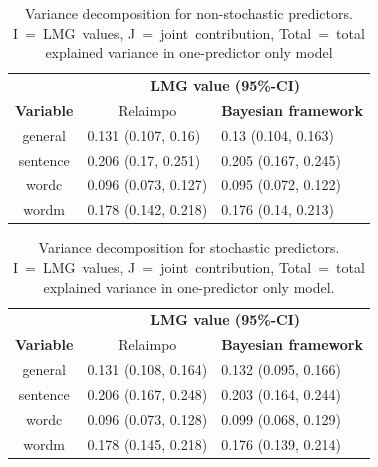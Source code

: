 \documentclass[11pt,a4paper,twoside]{book}\usepackage[]{graphicx}\usepackage[]{color}
\begin{document}
\begin{table}[h]
\caption{Variance decomposition for non-stochastic predictors. I~=~LMG~values, J~=~joint~contribution, Total~=~total explained variance in one-predictor only model}
\centering
\begin{tabular}{cll}
   \toprule
   &\multicolumn{2}{c}{\textbf{LMG value (95\%-CI)}} \\
 \textbf{Variable} & \multicolumn{1}{c}{Relaimpo} & \textbf{Bayesian framework}  \\
  \hline
general & 0.131 (0.107, 0.16)  & 0.13 (0.104, 0.163)  \\ 
sentence & 0.206 (0.17, 0.251)  & 0.205 (0.167, 0.245)   \\ 
wordc & 0.096 (0.073, 0.127)  & 0.095 (0.072, 0.122)  \\ 
wordm & 0.178 (0.142, 0.218) & 0.176 (0.14, 0.213)  \\ 
   \bottomrule
\end{tabular}
\label{tbl:empirical.relaimp.comp}
\end{table}





\begin{table}[h]
\caption{Variance decomposition for stochastic predictors. I~=~LMG~values, J~=~joint~contribution, Total~=~total explained variance in one-predictor only model.}
\centering
\begin{tabular}{cll}
   \toprule
   &\multicolumn{2}{c}{\textbf{LMG value (95\%-CI)}} \\
 \textbf{Variable} & \multicolumn{1}{c}{Relaimpo} & \textbf{Bayesian framework}  \\
  \hline
general & 0.131 (0.108, 0.164)  &  0.132 (0.095, 0.166)  \\ 
sentence & 0.206 (0.167, 0.248)  &  0.203 (0.164, 0.244)   \\ 
wordc & 0.096 (0.073, 0.128)  &  0.099 (0.068, 0.129)  \\ 
wordm & 0.178 (0.145, 0.218) &  0.176 (0.139, 0.214) \\ 
   \bottomrule
\end{tabular}
\label{tbl:empirical.relaimp.comp.stoch}
\end{table}






\end{document}
